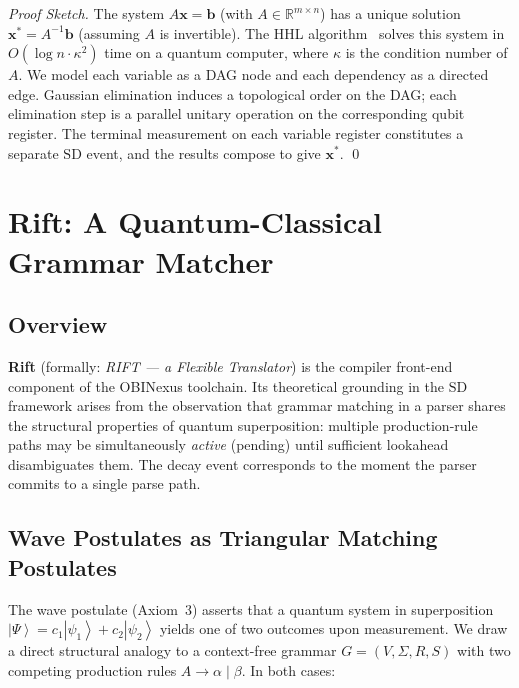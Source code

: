 \documentclass[12pt, a4paper]{article}
\theoremstyle{plain}
\theoremstyle{definition}
\theoremstyle{remark}
\newcommand{\ket}[1]{\left| #1 \right\rangle}
\newcommand{\SD}{\ensuremath{\mathrm{SD}}}   %
\newcommand{\Real}{\mathbb{R}}
\begin{document}
\begin{proof}[Proof Sketch]
  The system $A\mathbf{x} = \mathbf{b}$ (with $A \in \Real^{m \times n}$)
  has a unique solution $\mathbf{x}^* = A^{-1}\mathbf{b}$ (assuming $A$ is
  invertible).  The HHL algorithm~\cite{harrow2009} solves this system in
  $O(\log n \cdot \kappa^2)$ time on a quantum computer, where $\kappa$ is
  the condition number of $A$.  We model each variable as a DAG node and
  each dependency as a directed edge.  Gaussian elimination induces a
  topological order on the DAG; each elimination step is a parallel unitary
  operation on the corresponding qubit register.  The terminal measurement
  on each variable register constitutes a separate \SD{} event, and the
  results compose to give $\mathbf{x}^*$. \qed
\end{proof}

\section{Rift: A Quantum-Classical Grammar Matcher}
\label{sec:rift}

\subsection{Overview}

\textbf{Rift} (formally: \emph{RIFT --- a Flexible Translator}) is the
compiler front-end component of the OBINexus toolchain.  Its theoretical
grounding in the \SD{} framework arises from the observation that grammar
matching in a parser shares the structural properties of quantum superposition:
multiple production-rule paths may be simultaneously \emph{active} (pending)
until sufficient lookahead disambiguates them.  The decay event corresponds to
the moment the parser commits to a single parse path.

\subsection{Wave Postulates as Triangular Matching Postulates}

The wave postulate (Axiom~3) asserts that a quantum system in superposition
$\ket{\Psi} = c_1 \ket{\psi_1} + c_2 \ket{\psi_2}$ yields one of two outcomes
upon measurement.  We draw a direct structural analogy to a context-free
grammar $G = (V, \Sigma, R, S)$ with two competing production rules
$A \to \alpha \mid \beta$.  In both cases:
\end{document}
